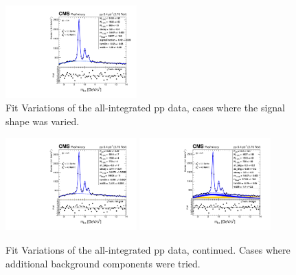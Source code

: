 \begin{figure}
\begin{center}
  \includegraphics[width=0.45\textwidth]{Chapters/aYield/pp/pt_3p5_4/Rap/Rap_0_2p4/pp2p76tev_Rap_0_2p4_fsr6.pdf}
 \caption{Fit Variations of the all-integrated pp data, cases where
   the signal shape was varied.}
 \label{fig:fitVar_ppMB-1}
\end{center}
\end{figure}
\begin{figure}
\begin{center}
  \includegraphics[width=0.45\textwidth]{Chapters/aYield/pp/pt_3p5_4/Rap/Rap_0_2p4/pp2p76tev_Rap_0_2p4_fsr1__bkg1.pdf}
  \includegraphics[width=0.45\textwidth]{Chapters/aYield/pp/pt_3p5_4/Rap/Rap_0_2p4/pp2p76tev_Rap_0_2p4_fsr1__bkg2.pdf}
 \caption{Fit Variations of the all-integrated pp data,
   continued. Cases where additional background components were
   tried.}
 \label{fig:fitVar_ppMB-2}
\end{center}
\end{figure}



